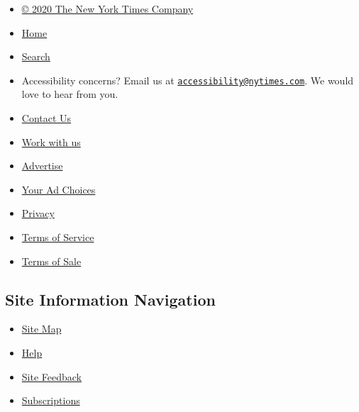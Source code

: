 \begin{itemize}
\tightlist
\item
  \href{https://help.nytimes.com/hc/en-us/articles/115014792127-Copyright-notice}{©
  2020 The New York Times Company}
\item
  \href{https://www.nytimes.com}{Home}
\item
  \href{https://www.nytimes.com/search/}{Search}
\item
  Accessibility concerns? Email us at
  \href{mailto:accessibility@nytimes.com}{\nolinkurl{accessibility@nytimes.com}}.
  We would love to hear from you.
\item
  \href{https://help.nytimes.com/hc/en-us/articles/115015385887-Contact-Us}{Contact
  Us}
\item
  \href{https://www.nytco.com/careers/}{Work with us}
\item
  \href{https://nytmediakit.com/}{Advertise}
\item
  \href{https://help.nytimes.com/hc/en-us/articles/115014892108-Privacy-policy\#pp}{Your
  Ad Choices}
\item
  \href{https://help.nytimes.com/hc/en-us/articles/115014892108-Privacy-policy}{Privacy}
\item
  \href{https://help.nytimes.com/hc/en-us/articles/115014893428-Terms-of-service}{Terms
  of Service}
\item
  \href{https://help.nytimes.com/hc/en-us/articles/115014893968-Terms-of-sale}{Terms
  of Sale}
\end{itemize}

\hypertarget{site-information-navigation-1}{%
\subsection{Site Information
Navigation}\label{site-information-navigation-1}}

\begin{itemize}
\tightlist
\item
  \href{https://spiderbites.nytimes.com}{Site Map}
\item
  \href{https://help.nytimes.com/hc/en-us}{Help}
\item
  \href{https://help.nytimes.com/hc/en-us/articles/115015385887-Contact-Us?redir=myacc}{Site
  Feedback}
\item
  \href{https://www.nytimes.com/subscription?campaignId=37WXW}{Subscriptions}
\end{itemize}
